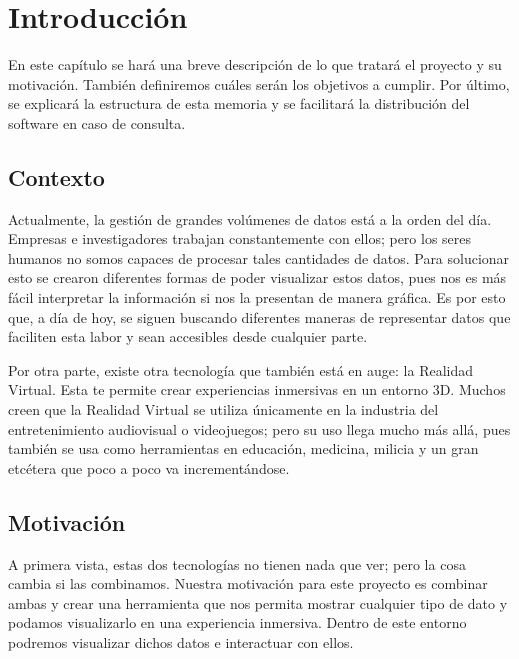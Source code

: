 \documentclass[a4paper, 12pt]{book}
\begin{document}

\cleardoublepage
\chapter{Introducción}
\label{sec:intro} %

En este capítulo se hará una breve descripción de lo que tratará el proyecto y su motivación. También definiremos cuáles serán los objetivos a cumplir. Por último, se explicará la estructura de esta memoria y se facilitará la distribución del software en caso de consulta. 

\section{Contexto}
\label{sec:contexto}

Actualmente, la gestión de grandes volúmenes de datos está a la orden del día. Empresas e investigadores trabajan constantemente con ellos; pero los seres humanos no somos capaces de procesar tales cantidades de datos. Para solucionar esto se crearon diferentes formas de poder visualizar estos datos, pues nos es más fácil interpretar la información si nos la presentan de manera gráfica. Es por esto que, a día de hoy, se siguen buscando diferentes maneras de representar datos que faciliten esta labor y sean accesibles desde cualquier parte.

Por otra parte, existe otra tecnología que también está en auge: la Realidad Virtual. Esta te permite crear experiencias inmersivas en un entorno 3D. Muchos creen que la Realidad Virtual se utiliza únicamente en la industria del entretenimiento audiovisual o videojuegos; pero su uso llega mucho más allá, pues también se usa como herramientas en educación, medicina, milicia y un gran etcétera que poco a poco va incrementándose.


\section{Motivación}
\label{sec:motivacion}

A primera vista, estas dos tecnologías no tienen nada que ver; pero la cosa cambia si las combinamos. Nuestra motivación para este proyecto es combinar ambas y crear una herramienta que nos permita mostrar cualquier tipo de dato y podamos visualizarlo en una experiencia inmersiva. Dentro de este entorno podremos visualizar dichos datos e interactuar con ellos.
\end{document}
